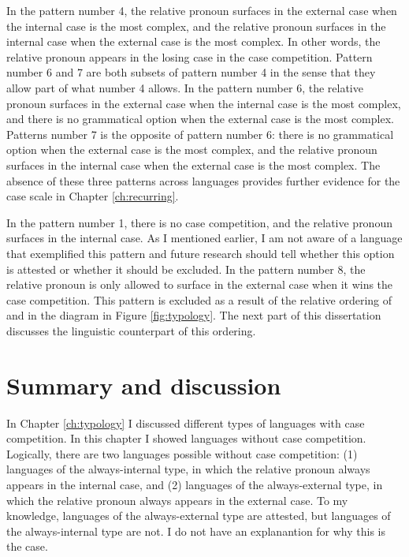 In the pattern number 4, the relative pronoun surfaces in the external case when the internal case is the most complex, and the relative pronoun surfaces in the internal case when the external case is the most complex. In other words, the relative pronoun  appears in the losing case in the case competition.
Pattern number 6 and 7 are both subsets of pattern number 4 in the sense that they allow part of what number 4 allows.
In the pattern number 6, the relative pronoun surfaces in the external case when the internal case is the most complex, and there is no grammatical option when the external case is the most complex.
Patterns number 7 is the opposite of pattern number 6: there is no grammatical option when the external case is the most complex, and the relative pronoun surfaces in the internal case when the external case is the most complex.
The absence of these three patterns across languages provides further evidence for the case scale in Chapter \ref{ch:recurring}.

In the pattern number 1, there is no case competition, and the relative pronoun surfaces in the internal case. As I mentioned earlier, I am not aware of a language that exemplified this pattern and future research should tell whether this option is attested or whether it should be excluded.
In the pattern number 8, the relative pronoun is only allowed to surface in the external case when it wins the case competition. This pattern is excluded as a result of the relative ordering of  and  in the diagram in Figure \ref{fig:typology}. The next part of this dissertation discusses the linguistic counterpart of this ordering.


\section{Summary and discussion}

In Chapter \ref{ch:typology} I discussed different types of languages with case competition. In this chapter I showed languages without case competition. Logically, there are two languages possible without case competition: (1) languages of the always-internal type, in which the relative pronoun always appears in the internal case, and (2) languages of the always-external type, in which the relative pronoun always appears in the external case. To my knowledge, languages of the always-external type are attested, but languages of the always-internal type are not. I do not have an explanantion for why this is the case.


